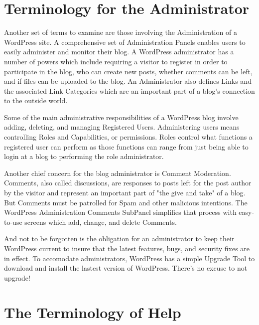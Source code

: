 \section{Terminology for the Administrator}

Another set of terms to examine are those involving the Administration of a WordPress site. A comprehensive set of Administration Panels enables users to easily administer and monitor their blog. A WordPress administrator has a number of powers which include requiring a visitor to register in order to participate in the blog, who can create new posts, whether comments can be left, and if files can be uploaded to the blog. An Administrator also defines Links and the associated Link Categories which are an important part of a blog's connection to the outside world.

Some of the main administrative responsibilities of a WordPress blog involve adding, deleting, and managing Registered Users. Administering users means controlling Roles and Capabilities, or permissions. Roles control what functions a registered user can perform as those functions can range from just being able to login at a blog to performing the role administrator.

Another chief concern for the blog administrator is Comment Moderation. Comments, also called discussions, are responses to posts left for the post author by the visitor and represent an important part of "the give and take" of a blog. But Comments must be patrolled for Spam and other malicious intentions. The WordPress Administration Comments SubPanel simplifies that process with easy-to-use screens which add, change, and delete Comments.

And not to be forgotten is the obligation for an administrator to keep their WordPress current to insure that the latest features, bugs, and security fixes are in effect. To accomodate administrators, WordPress has a simple Upgrade Tool to download and install the lastest version of WordPress. There's no excuse to not upgrade!

\section{The Terminology of Help}


